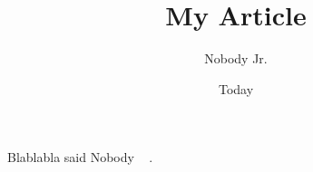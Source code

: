 \documentclass[11pt]{article}
\begin{document}
\title{My Article}
\author{Nobody Jr.}
\date{Today}
\maketitle

Blablabla said Nobody ~ \cite{Nobody06}.

{}

\end{document}
